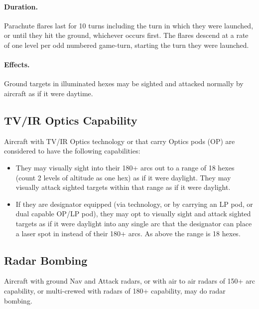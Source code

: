 \begin{advancedrules}
{\paragraph{Duration.} Parachute flares last for 10 turns including the turn in which they were launched, or until they hit the ground, whichever occurs first. The flares descend at a rate of one level per odd numbered game-turn, starting the turn they were launched.

\paragraph{Effects.} Ground targets in illuminated hexes may be sighted and attacked normally by aircraft as if it were daytime.

\subsection{TV/IR Optics Capability}

Aircraft with TV/IR Optics technology or that carry Optics pods (OP) are considered to have the following capabilities:

\begin{itemize}

    \item They may visually sight into their 180+ arcs out to a range of 18 hexes (count 2 levels of altitude as one hex) as if it were daylight. They may visually attack sighted targets within that range as if it were daylight. 

    \item If they are designator equipped (via technology, or by carrying an LP pod, or dual capable OP/LP pod), they may opt to visually sight and attack sighted targets as if it were daylight into any single arc that the designator can place a laser spot in instead of their 180+ arcs. As above the range is 18 hexes.

\end{itemize}

\subsection{Radar Bombing}

Aircraft with ground Nav and Attack radars, or with air to air radars of 150+ arc capability, or multi-crewed with radars of 180+ capability, may do radar bombing.

}
\end{advancedrules}
